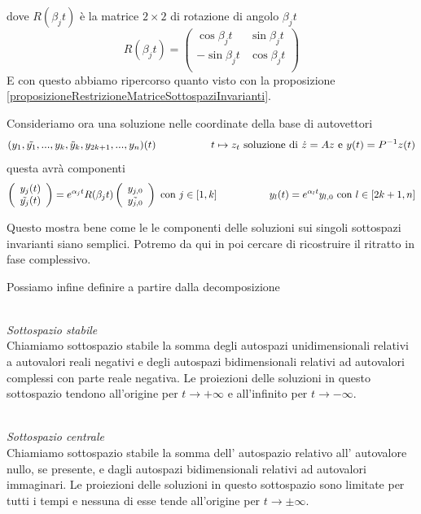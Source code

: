 \documentclass[11pt,a4paper,twoside]{book}
\newenvironment{definizione}[1][\empty]{\begin{Definizione}{
\ifx\empty#1\relax\else\mdseries\itshape#1\\\fi
}{}}{\end{Definizione}}
\theoremstyle{esss}
\theoremstyle{dotless}
\numberwithin{equation}{section} %
\begin{document}
dove $R(\beta_jt)$ è la matrice $2\times 2$ di rotazione di angolo $\beta_j t$
\[
R(\beta_j t)=\left( \begin{array}{cc}
\cos{\beta_j t} & \sin{\beta_j t} \\
-\sin{\beta_j t} & \cos{\beta_j t}\\
\end{array}\right)
\]
E con questo abbiamo ripercorso quanto visto con la proposizione \ref{proposizioneRestrizioneMatriceSottospaziInvarianti}.
	
Consideriamo ora una soluzione nelle coordinate della base di autovettori
\[
(y_1,\tilde{y_1},...,y_k,\tilde{y}_k,y_{2k+1},...,y_n)(t) \hspace{0.15\linewidth} t\mapsto z_t \text{ soluzione di } \dot{z}=Az \text{ e } y(t)=P^{-1}z(t)
\]
questa avrà componenti
\[
\left(\begin{array}{c}
y_j(t) \\
\tilde{y_j}(t) \\
\end{array}\right)=
e^{\alpha_j t} R(\beta_j t)
\left(\begin{array}{c}
y_{j,0} \\
\tilde{y_{j,0}} \\
\end{array}\right)
\text{ con } j\in[1,k] \hspace{0.15\linewidth}
y_l(t)=e^{\alpha_l t}y_{l,0} \text{ con } l\in[2k+1,n]
\]

Questo mostra bene come le le componenti delle soluzioni sui singoli sottospazi invarianti siano semplici. Potremo da qui in poi cercare di ricostruire il ritratto in fase complessivo.

Possiamo infine definire a partire dalla decomposizione
\begin{definizione}\textit{Sottospazio stabile} \\
Chiamiamo sottospazio stabile la somma degli autospazi unidimensionali relativi a autovalori reali negativi e degli autospazi bidimensionali relativi ad autovalori complessi con parte reale negativa. Le proiezioni delle soluzioni in questo sottospazio tendono all'origine per $t\rightarrow +\infty$ e all'infinito per $t\rightarrow -\infty$.\\
\end{definizione}

\begin{definizione}\textit{Sottospazio centrale}\\
Chiamiamo sottospazio stabile la somma dell' autospazio relativo all' autovalore nullo, se presente, e dagli autospazi bidimensionali relativi ad autovalori immaginari. Le proiezioni delle soluzioni in questo sottospazio sono limitate per tutti i tempi e nessuna di esse tende all'origine per $t\rightarrow \pm\infty$.\\
\end{definizione}
\end{document}
